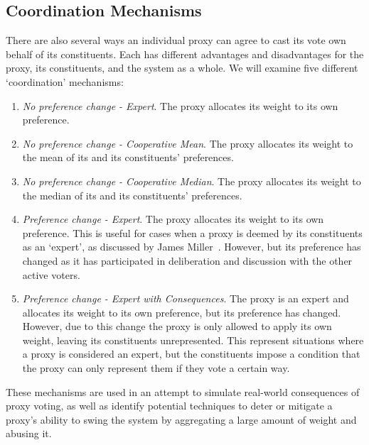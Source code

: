 
\subsection{Coordination Mechanisms}\label{subsec:coordination-mechanisms}
There are also several ways an individual proxy can agree to cast its vote own behalf
of its constituents.
Each has different advantages and disadvantages for the proxy, its constituents, and
the system as a whole.
We will examine five different `coordination' mechanisms:
\begin{enumerate}
    \item {
        \textit{No preference change - Expert}.
        The proxy allocates its weight to its own preference.
    }
    \item {
        \textit{No preference change - Cooperative Mean}.
        The proxy allocates its weight to the mean of its and its constituents'
        preferences.
    }
    \item {
        \textit{No preference change - Cooperative Median}.
        The proxy allocates its weight to the median of its and its constituents'
        preferences.
    }
    \item {
        \textit{Preference change - Expert}.
        The proxy allocates its weight to its own preference.
        This is useful for cases when a proxy is deemed by its constituents as an
        `expert', as discussed by James Miller~\cite{Miller1969}.
        However, but its preference has changed as it has participated in
        deliberation and discussion with the other active voters.
    }
    \item {
        \textit{Preference change - Expert with Consequences}.
        The proxy is an expert and allocates its weight to its own preference, but its
        preference has changed.
        However, due to this change the proxy is only allowed to apply its own
        weight, leaving its constituents unrepresented.
        This represent situations where a proxy is considered an expert, but the
        constituents impose a condition that the proxy can only represent them if
        they vote a certain way.
    }
\end{enumerate}
These mechanisms are used in an attempt to simulate real-world consequences of proxy
voting, as well as identify potential techniques to deter or mitigate a proxy's
ability to swing the system by aggregating a large amount of weight and abusing it.
